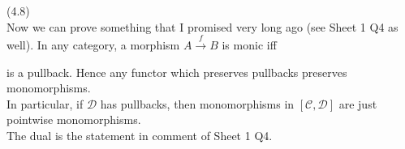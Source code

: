 \documentclass[a4paper]{article}
\begin{document}
\begin{rem} (4.8)\\
    Now we can prove something that I promised very long ago (see Sheet 1 Q4 as well). In any category, a morphism $A \xrightarrow{f} B$ is monic iff
    is a pullback. Hence any functor which preserves pullbacks preserves monomorphisms.\\
    In particular, if $\mathcal{D}$ has pullbacks, then monomorphisms in $[\mathcal{C},\mathcal{D}]$ are just pointwise monomorphisms.\\
    The dual is the statement in comment of Sheet 1 Q4.
\end{rem}
\end{document}
